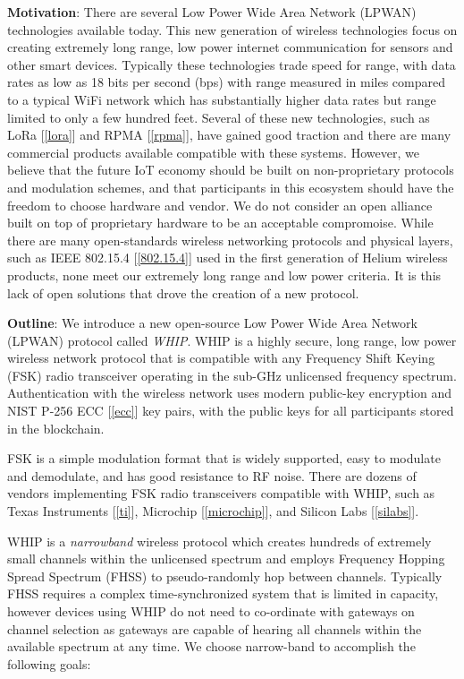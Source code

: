 \documentclass[letterpaper,11pt]{article}
\begin{document}
\textbf{Motivation}: There are several Low Power Wide Area Network (LPWAN) technologies available today. This new generation of wireless technologies focus on creating extremely long range, low power internet communication for sensors and other smart devices. Typically these technologies trade speed for range, with data rates as low as 18 bits per second (bps) with range measured in miles compared to a typical WiFi network which has substantially higher data rates but range limited to only a few hundred feet. Several of these new technologies, such as LoRa [\ref{lora}] and RPMA [\ref{rpma}], have gained good traction and there are many commercial products available compatible with these systems. However, we believe that the future IoT economy should be built on non-proprietary protocols and modulation schemes, and that participants in this ecosystem should have the freedom to choose hardware and vendor. We do not consider an open alliance built on top of proprietary hardware to be an acceptable compromoise. While there are many open-standards wireless networking protocols and physical layers, such as IEEE 802.15.4 [\ref{802.15.4}] used in the first generation of Helium wireless products, none meet our extremely long range and low power criteria. It is this lack of open solutions that drove the creation of a new protocol.\newline

\textbf{Outline}: We introduce a new open-source Low Power Wide Area Network (LPWAN) protocol called \textit{WHIP}. WHIP is a highly secure, long range, low power wireless network protocol that is compatible with any Frequency Shift Keying (FSK) radio transceiver operating in the sub-GHz unlicensed frequency spectrum. Authentication with the wireless network uses modern public-key encryption and NIST P-256 ECC [\ref{ecc}] key pairs, with the public keys for all participants stored in the blockchain.\newline

FSK is a simple modulation format that is widely supported, easy to modulate and demodulate, and has good resistance to RF noise. There are dozens of vendors implementing FSK radio transceivers compatible with WHIP, such as Texas Instruments [\ref{ti}], Microchip [\ref{microchip}], and Silicon Labs [\ref{silabs}].\newline

WHIP is a \textit{narrowband} wireless protocol which creates hundreds of extremely small channels within the unlicensed spectrum and employs Frequency Hopping Spread Spectrum (FHSS) to pseudo-randomly hop between channels. Typically FHSS requires a complex time-synchronized system that is limited in capacity, however devices using WHIP do not need to co-ordinate with gateways on channel selection as gateways are capable of hearing all channels within the available spectrum at any time. We choose narrow-band to accomplish the following goals:
\end{document}

